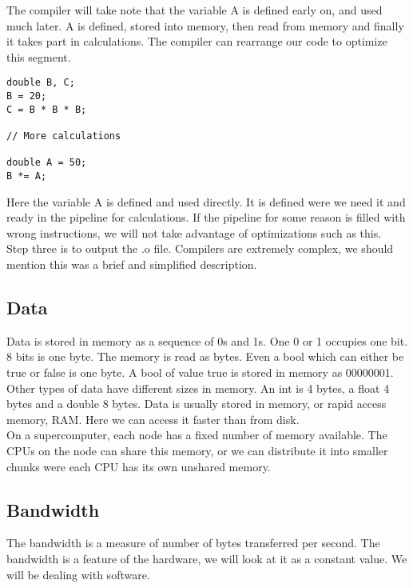 The compiler will take note that the variable A is defined early on, and used much later. A is defined, stored into memory, then read from memory and finally it takes part in calculations. The compiler can rearrange our code to optimize this segment. 

\begin{lstlisting}
double B, C;
B = 20;
C = B * B * B;

// More calculations

double A = 50;
B *= A;
\end{lstlisting}

Here the variable A is defined and used directly. It is defined were we need it and ready in the pipeline for calculations. If the pipeline for some reason is filled with wrong instructions, we will not take advantage of optimizations such as this. \\

Step three is to output the .o file. Compilers are extremely complex, we should mention this was a brief and simplified description. 

\subsection{Data}
Data is stored in memory as a sequence of 0s and 1s. One 0 or 1 occupies one bit. 8 bits is one byte. The memory is read as bytes. Even a bool which can either be true or false is one byte. A bool of value true is stored in memory as 00000001. \\

Other types of data have different sizes in memory. An int is 4 bytes, a float 4 bytes and a double 8 bytes. Data is usually stored in memory, or rapid access memory, RAM. Here we can access it faster than from disk. \\

On a supercomputer, each node has a fixed number of memory available. The CPUs on the node can share this memory, or we can distribute it into smaller chunks were each CPU has its own unshared memory. 

\subsection{Bandwidth}
The bandwidth is a measure of number of bytes transferred per second. The bandwidth is a feature of the hardware, we will look at it as a constant value. We will be dealing with software. \\

